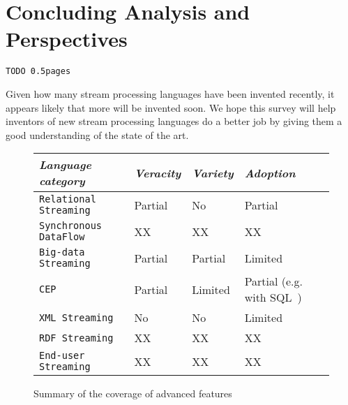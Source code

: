 \section{Concluding Analysis and Perspectives}\label{sec:conclusion}

\begin{alltt}TODO\scriptsize ~0.5 pages
\end{alltt}


Given how many stream processing languages have been invented recently, it appears likely that more will be invented soon. We hope this survey will help inventors of new stream processing languages do a better job by giving them a good understanding of the state of the art.

\begin{figure*}\centering%
\begin{tabular}{| l | l | l | l |}\hline
{\em Language category}
& {\em Veracity} & {\em Variety} & {\em Adoption} \\\hline\hline

{\tt Relational Streaming} & Partial \cite{ali_et_al_2009} & No & Partial \cite{jain_et_al_2008} \\\hline
{\tt Synchronous DataFlow}  & XX & XX & XX \\\hline
{\tt Big-data Streaming}  & Partial \cite{akidau_et_al_2013} & Partial \cite{hirzel_schneider_gedik_2017} & Limited \\\hline
{\tt CEP} & Partial \cite{chandramouli_goldstein_maier_2010} & Limited & Partial (e.g. with SQL~\cite{zemke_et_al_2007}) \\\hline
{\tt XML Streaming} & No & No & Limited\\\hline
{\tt RDF Streaming} & XX & XX & XX \\\hline
{\tt End-user Streaming} & XX & XX & XX\\\hline
\end{tabular}
\vspace*{-0.2cm}
\caption{Summary of the coverage of advanced features}
\vspace*{-0.3cm}
\end{figure*} 
